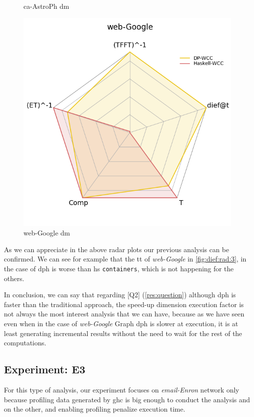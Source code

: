 \documentclass[preprint]{elsarticle}
\begin{document}
\begin{figure}[!htb]
\begin{minipage}{0.33\textwidth}
      \caption{ca-AstroPh \acrshort{dm}}
      \label{fig:dief:rad:2}
    \end{minipage}%
    \begin{minipage}{0.33\textwidth}
     \includegraphics[width=1\linewidth, height=0.2\textheight]{web_google_radar}
      \caption{web-Google \acrshort{dm}}
      \label{fig:dief:rad:3}
    \end{minipage}
\end{figure}

As we can appreciate in the above radar plots our previous analysis can be confirmed. We can see for example that the \acrlong{tt} of \emph{web-Google} in \autoref{fig:dief:rad:3}, in the case of \acrshort{dph} is worse than \acrshort{hs} \texttt{containers}, which is not happening for the others.

In conclusion, we can say that regarding [Q2] (\autoref{res:question}) although \acrshort{dph} is faster than the traditional approach, the speed-up dimension execution factor is not always the most interest analysis that we can have, because as we have seen even when in the case of \emph{web-Google} Graph \acrshort{dph} is slower at execution, it is at least generating incremental results without the need to wait for the rest of the computations.

\subsection{Experiment: E3}
For this type of analysis, our experiment focuses on \emph{email-Enron} network \cite{netenron} only because profiling data generated by \acrshort{ghc} is big enough to conduct the analysis and on the other, and enabling profiling penalize execution time.
\end{document}
